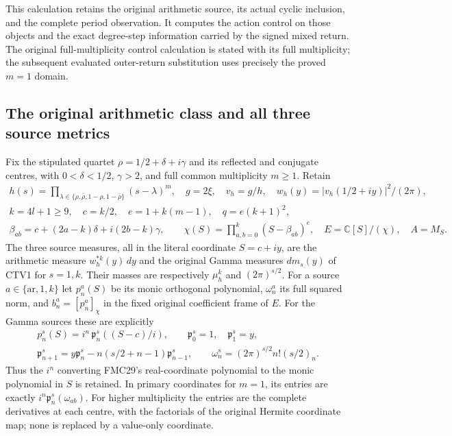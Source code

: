 \documentclass[11pt,a4paper]{article}
\begin{document}
This calculation retains the original arithmetic source, its actual
cyclic inclusion, and the complete period observation. It computes the
action control on those objects and the exact degree-step information
carried by the signed mixed return. The original full-multiplicity
control calculation is stated with its full multiplicity; the subsequent
evaluated outer-return substitution uses precisely the proved $m=1$
domain.

\subsection{The original arithmetic class and all three source metrics}
Fix the stipulated quartet $\rho=1/2+\delta+i\gamma$ and its
reflected and conjugate centres, with $0<\delta<1/2$, $\gamma>2$,
and full common multiplicity $m\ge1$. Retain
\[
 \begin{gathered}
 h(s)=\prod_{\lambda\in\{\rho,\bar\rho,1-\rho,1-\bar\rho\}}(s-\lambda)^m,
 \quad g=2\xi,\quad v_h=g/h,\quad
 w_h(y)=|v_h(1/2+iy)|^2/(2\pi),\\
 k=4l+1\ge9,\quad c=k/2,\quad e=1+k(m-1),\quad q=e(k+1)^2,\\
 \beta_{ab}=c+(2a-k)\delta+i(2b-k)\gamma,\qquad
 \chi(S)=\prod_{a,b=0}^k(S-\beta_{ab})^e,
 \quad E=\mathbb C[S]/(\chi),\quad A=M_S.
 \end{gathered}\tag{MCE1}
\]
The three source measures, all in the literal coordinate $S=c+iy$,
are the arithmetic measure $w_h^{*k}(y)\,dy$ and the original
Gamma measures $dm_s(y)$ of CTV1 for $s=1,k$. Their masses are
respectively $\mu_h^k$ and $(2\pi)^{s/2}$. For a source
$a\in\{\mathrm{ar},1,k\}$ let $p_n^a(S)$ be its monic orthogonal
polynomial, $\omega_n^a$ its full squared norm, and $b_n^a=[p_n^a]_\chi$
in the fixed original coefficient frame of $E$. For the Gamma sources
these are explicitly
\[
 \begin{gathered}
 p_n^s(S)=i^n\,\mathfrak p_n^s((S-c)/i),\qquad
 \mathfrak p_0^s=1,\quad\mathfrak p_1^s=y,\\
 \mathfrak p_{n+1}^s=y\mathfrak p_n^s-n(s/2+n-1)\mathfrak p_{n-1}^s,
 \qquad \omega_n^s=(2\pi)^{s/2}n!(s/2)_n .
 \end{gathered}\tag{MCE2}
\]
Thus the $i^n$ converting FMC29's real-coordinate polynomial to
the monic polynomial in $S$ is retained. In primary coordinates
for $m=1$, its entries are exactly
$i^n\mathfrak p_n^s(\omega_{ab})$. For higher multiplicity the
entries are the complete derivatives at each centre, with the
factorials of the original Hermite coordinate map; none is replaced
by a value-only coordinate.
\end{document}
